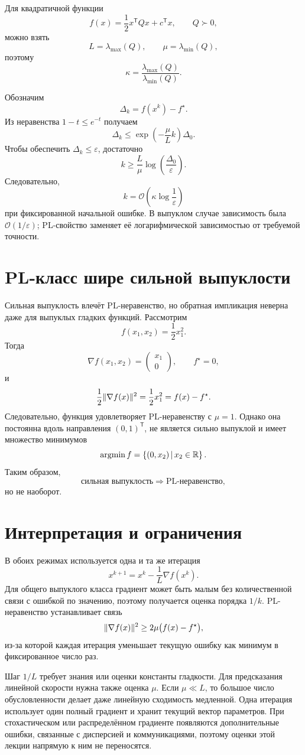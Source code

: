 Для квадратичной функции
\[
    f(x)=\frac12x^{\mathsf T}Qx+c^{\mathsf T}x,
    \qquad
    Q\succ0,
\]
можно взять
\[
    L=\lambda_{\max}(Q),
    \qquad
    \mu=\lambda_{\min}(Q),
\]
поэтому
\[
    \kappa
    =
    \frac{\lambda_{\max}(Q)}{\lambda_{\min}(Q)}.
\]

Обозначим
\[
    \Delta_k=f(x^k)-f^\star.
\]
Из неравенства \(1-t\le e^{-t}\) получаем
\[
    \Delta_k
    \le
    \exp\left(-\frac\mu Lk\right)\Delta_0.
\]
Чтобы обеспечить \(\Delta_k\le\varepsilon\), достаточно
\[
    k
    \ge
    \frac L\mu
    \log\left(\frac{\Delta_0}{\varepsilon}\right).
\]
Следовательно,
\[
    k
    =
    \mathcal O\!\left(
        \kappa\log\frac1\varepsilon
    \right)
\]
при фиксированной начальной ошибке. В выпуклом случае зависимость была
\(\mathcal O(1/\varepsilon)\); PL-свойство заменяет её логарифмической
зависимостью от требуемой точности.

\section{PL-класс шире сильной выпуклости}

Сильная выпуклость влечёт PL-неравенство, но обратная импликация
неверна даже для выпуклых гладких функций. Рассмотрим
\[
    f(x_1,x_2)=\frac12x_1^2.
\]
Тогда
\[
    \nabla f(x_1,x_2)
    =
    \begin{pmatrix}
        x_1\\
        0
    \end{pmatrix},
    \qquad
    f^\star=0,
\]
и
\[
    \frac12\lVert\nabla f(x)\rVert^2
    =
    \frac12x_1^2
    =
    f(x)-f^\star.
\]
Следовательно, функция удовлетворяет PL-неравенству с \(\mu=1\).
Однако она постоянна вдоль направления \((0,1)^{\mathsf T}\), не
является сильно выпуклой и имеет множество минимумов
\[
    \operatorname*{argmin}f
    =
    \left\{ (0,x_2) \,\middle|\, x_2\in\mathbb{R} \right\}.
\]
Таким образом,
\[
    \text{сильная выпуклость}
    \Longrightarrow
    \text{PL-неравенство},
\]
но не наоборот.

\section{Интерпретация и ограничения}

В обоих режимах используется одна и та же итерация
\[
    x^{k+1}=x^k-\frac1L\nabla f(x^k).
\]
Для общего выпуклого класса градиент может быть малым без
количественной связи с ошибкой по значению, поэтому получается оценка
порядка \(1/k\). PL-неравенство устанавливает связь
\[
    \lVert\nabla f(x)\rVert^2
    \ge
    2\mu\bigl(f(x)-f^\star\bigr),
\]
из-за которой каждая итерация уменьшает текущую ошибку как минимум в
фиксированное число раз.

Шаг \(1/L\) требует знания или оценки константы гладкости. Для
предсказания линейной скорости нужна также оценка \(\mu\). Если
\(\mu\ll L\), то большое число обусловленности делает даже линейную
сходимость медленной. Одна итерация использует один полный градиент и
хранит текущий вектор параметров. При стохастическом или
распределённом градиенте появляются дополнительные ошибки, связанные
с дисперсией и коммуникациями, поэтому оценки этой лекции напрямую к
ним не переносятся.

